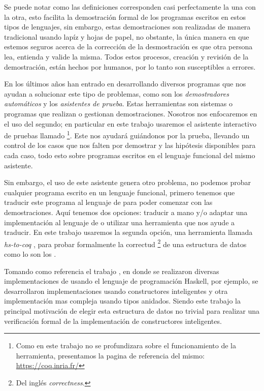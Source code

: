 Se puede notar como las definiciones corresponden casi perfectamente la una con la otra,
esto facilita la demostraci\'on formal de los programas escritos en estos tipos de lenguajes, sin
embargo, estas demostraciones son realizadas de manera tradicional usando lap\'iz y hojas de papel,
no obstante, la \'unica manera en que estemos seguros acerca de la correcci\'on de la desmostraci\'on es
que otra persona lea, entienda y valide la misma. Todos estos procesos, creaci\'on y revisi\'on de la
demostraci\'on, están hechos por humanos, por lo tanto son susceptibles a errores.

En los últimos años han entrado en desarrollando diversos programas que nos ayudan a solucionar
este tipo de problemas, como son los \textit{demostradores autom\'aticos} y los \textit{asistentes de
prueba}. Estas herramientas son sistemas o programas que realizan o gestionan demostraciones. Nosotros
nos enfocaremos en el uso del segundo; en particular en este trabajo usaremos el
asistente interactivo de pruebas llamado {\coq}\footnote{Como en este trabajo no se profundizara sobre el funcionamiento de la herramienta, presentamos la pagina de referencia del mismo: \url{https://coq.inria.fr/}}. Este nos ayudar\'a gui\'andonos por la prueba, llevando un
control de los casos que nos falten por demostrar y las hip\'otesis disponibles para cada caso,
todo esto sobre programas escritos en el lenguaje funcional del mismo asistente.

Sin embargo, el uso de este asistente genera otro problema, no podemos probar cualquier programa
escrito en un lenguaje funcional, primero tenemos que traducir este programa al lenguaje de {\coq}
para poder comenzar con las demostraciones. Aquí tenemos dos opciones: traducir a mano y/o adaptar una implementación al lenguaje de {\coq} o utilizar
una herramienta que nos ayude a traducir. En este trabajo usaremos la segunda opci\'on, una
herramienta llamada \textit{hs-to-coq} \cite{thrc}, para probar formalmente la
correctud \footnote{Del ingl\'es \textit{correctness}.} de una estructura de datos como lo son los {\arns}.

Tomando como referencia el trabajo \cite{tesisG}, en donde se realizaron diversas implementaciones de {\arns} usando el
lenguaje de programaci\'on Haskell, por ejemplo, se desarrollaron implementaciones usando constructores inteligentes y otra
implementaci\'on mas compleja usando tipos anidados. Siendo este trabajo la principal motivaci\'on
de elegir esta estructura de datos no trivial para realizar una verificaci\'on formal de la implementaci\'on de constructores inteligentes.

